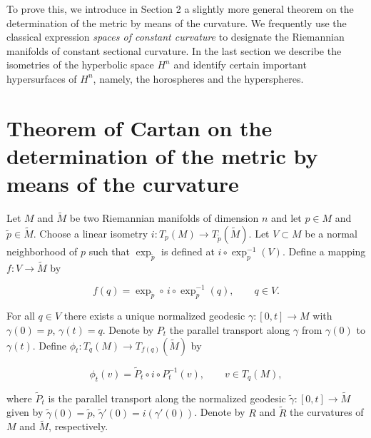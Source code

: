 To prove this, we introduce in Section 2 a slightly more general theorem on the
determination of the metric by means of the curvature. We frequently use the
classical expression \emph{spaces of constant curvature} to designate the Riemannian
manifolds of constant sectional curvature. In the last section we describe the
isometries of the hyperbolic space $H^n$ and identify certain important
hypersurfaces of $H^n$, namely, the horospheres and the hyperspheres.

\section{Theorem of Cartan on the determination of the metric by means of the curvature}

Let $M$ and $\tilde{M}$ be two Riemannian manifolds of dimension $n$ and let
$p\in M$ and $\tilde{p}\in\tilde{M}$. Choose a linear isometry
$i:T_p(M)\to T_{\tilde{p}}(\tilde{M})$. Let $V\subset M$ be a normal neighborhood
of $p$ such that $\exp_{\tilde{p}}$ is defined at $i\circ\exp_p^{-1}(V)$. Define a
mapping $f:V\to\tilde{M}$ by

$$
f(q)=\exp_{\tilde{p}}\circ\,i\circ\exp_p^{-1}(q),\qquad q\in V.
$$

For all $q\in V$ there exists a unique normalized geodesic $\gamma:[0,t]\to M$
with $\gamma(0)=p$, $\gamma(t)=q$. Denote by $P_t$ the parallel transport along
$\gamma$ from $\gamma(0)$ to $\gamma(t)$. Define $\phi_t:T_q(M)\to T_{f(q)}(\tilde{M})$
by

$$
\phi_t(v)=\tilde{P}_t\circ i\circ P_t^{-1}(v),\qquad v\in T_q(M),
$$

where $\tilde{P}_t$ is the parallel transport along the normalized geodesic
$\tilde{\gamma}:[0,t]\to\tilde{M}$ given by $\tilde{\gamma}(0)=\tilde{p}$,
$\tilde{\gamma}'(0)=i(\gamma'(0))$. Denote by $R$ and $\tilde{R}$ the curvatures of
$M$ and $\tilde{M}$, respectively.

